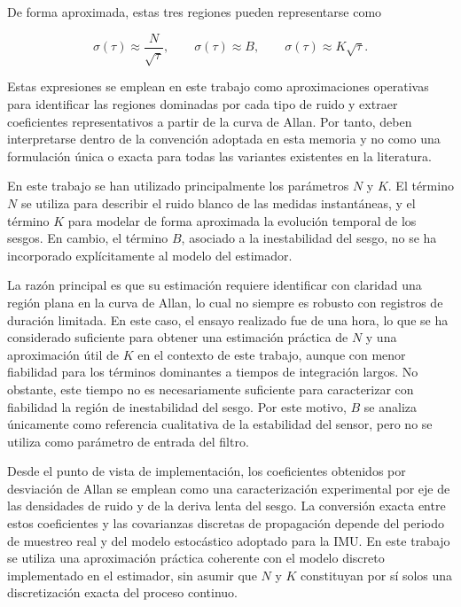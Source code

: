 De forma aproximada, estas tres regiones pueden representarse como

\begin{equation}
    \sigma(\tau)
    \approx
    \frac{N}{\sqrt{\tau}},
    \qquad
    \sigma(\tau)
    \approx
    B,
    \qquad
    \sigma(\tau)
    \approx
    K\sqrt{\tau}.
\end{equation}

Estas expresiones se emplean en este trabajo como aproximaciones operativas para identificar las regiones dominadas por cada tipo de ruido y extraer coeficientes representativos a partir de la curva de Allan. Por tanto, deben interpretarse dentro de la convención adoptada en esta memoria y no como una formulación única o exacta para todas las variantes existentes en la literatura.

En este trabajo se han utilizado principalmente los parámetros \(N\) y \(K\).
El término \(N\) se utiliza para describir el ruido blanco de las medidas instantáneas, y
el término \(K\) para modelar de forma aproximada la evolución temporal de los sesgos. En cambio, el término
\(B\), asociado a la inestabilidad del sesgo, no se ha incorporado explícitamente al modelo
del estimador.

La razón principal es que su estimación
requiere identificar con claridad una región plana en la curva de Allan, lo cual no siempre
es robusto con registros de duración limitada. En este caso, el ensayo realizado fue de una
hora, lo que se ha considerado suficiente para obtener una estimación práctica de \(N\) y una
aproximación útil de \(K\) en el contexto de este trabajo, aunque con menor fiabilidad para
los términos dominantes a tiempos de integración largos. No obstante, este tiempo no es
necesariamente suficiente para caracterizar con fiabilidad la región de inestabilidad del sesgo. Por
este motivo, \(B\) se analiza únicamente como referencia cualitativa de la estabilidad del
sensor, pero no se utiliza como parámetro de entrada del filtro.

Desde el punto de vista de implementación, los coeficientes obtenidos por desviación de Allan se emplean como una caracterización 
experimental por eje de las densidades de ruido y de la deriva lenta del sesgo. La conversión exacta entre estos coeficientes y las 
covarianzas discretas de propagación depende del periodo de muestreo real y del modelo estocástico adoptado para la IMU. En este 
trabajo se utiliza una aproximación práctica coherente con el modelo discreto implementado en el estimador, sin asumir que \(N\) y 
\(K\) constituyan por sí solos una discretización exacta del proceso continuo.


